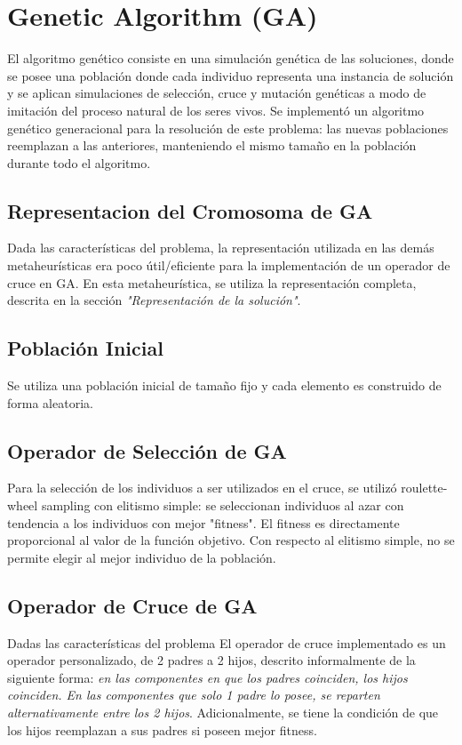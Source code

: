 \documentclass{ci5652}
\begin{document}
\section{Genetic Algorithm (GA)}
El algoritmo genético consiste en una simulación genética de las soluciones, donde se posee una población donde cada individuo representa una instancia de solución y se aplican simulaciones de selección, cruce y mutación genéticas a modo de imitación del proceso natural de los seres vivos. Se implementó un algoritmo genético generacional para la resolución de este problema: las nuevas poblaciones reemplazan a las anteriores, manteniendo el mismo tamaño en la población durante todo el algoritmo.

\subsection{Representacion del Cromosoma de GA}
Dada las características del problema, la representación utilizada en las demás metaheurísticas era poco útil/eficiente para la implementación de un operador de cruce en GA. En esta metaheurística, se utiliza la representación completa, descrita en la sección \textit{"Representación de la solución"}.

\subsection{Población Inicial}
Se utiliza una población inicial de tamaño fijo y cada elemento es construido de forma aleatoria.

\subsection{Operador de Selección de GA}
Para la selección de los individuos a ser utilizados en el cruce, se utilizó roulette-wheel sampling con elitismo simple: se seleccionan individuos al azar con tendencia a los individuos con mejor "fitness". El fitness es directamente proporcional al valor de la función objetivo. Con respecto al elitismo simple, no se permite elegir al mejor individuo de la población.

\subsection{Operador de Cruce de GA}
Dadas las características del problema El operador de cruce implementado es un operador personalizado, de 2 padres a 2 hijos, descrito informalmente de la siguiente forma: \textit{en las componentes en que los padres coinciden, los hijos coinciden. En las componentes que solo 1 padre lo posee, se reparten alternativamente entre los 2 hijos}. Adicionalmente, se tiene la condición de que los hijos reemplazan a sus padres si poseen mejor fitness.
\end{document}
